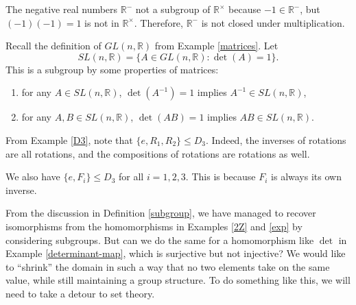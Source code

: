 \documentclass{amsart}
\begin{document}
\begin{example}
	The negative real numbers \(\mathbb{R}^-\) not a subgroup of
	\(\mathbb{R}^\times\) because \(-1\in\mathbb{R}^-\), but \((-1)(-1) =
	1\) is not in \(\mathbb{R}^\times\). Therefore, \(\mathbb{R}^-\) is not
	closed under multiplication.
\end{example}

\begin{example}\label{sl_n R}
	Recall the definition of \(GL(n, \mathbb{R})\) from Example \ref{matrices}.
	Let 
	\[
	   SL(n, \mathbb{R}) = \{A\in GL(n, \mathbb{R}) : \det(A) = 1\}.
	\] 
	This is a subgroup by some properties of matrices: 
	\begin{enumerate}[label=(\roman*)]
		\item for any \(A\in SL(n, \mathbb{R})\), \(\det(A^{-1}) = 1\) implies
		\(A^{-1}\in SL(n, \mathbb{R})\),
		\item for any \(A, B\in SL(n, \mathbb{R})\), \(\det(AB) = 1\) implies
		\(AB\in SL(n, \mathbb{R})\).
	\end{enumerate}
\end{example}

\begin{example}\label{D3-subgroups}
	From Example \ref{D3}, note that \(\{e, R_1, R_2\}\le D_3\). Indeed, the
	inverses of
	rotations are all rotations, and the compositions of rotations are rotations
	as well. 

	We also have \(\{e, F_i\}\le D_3\) for all \(i = 1, 2, 3\). This is because
	\(F_i\) is always its own inverse.
\end{example}

From the discussion in Definition \ref{subgroup}, we have managed to recover
isomorphisms from the homomorphisms in Examples \ref{2Z} and \ref{exp} by
considering subgroups. But can we do the same for a homomorphism like \(\det\)
in Example \ref{determinant-map}, which is surjective but not injective? We
would like to ``shrink'' the domain in such a way that no two elements take on
the same value, while still maintaining a group structure. To do something like
this, we will need to take a detour to set theory.
\end{document}
